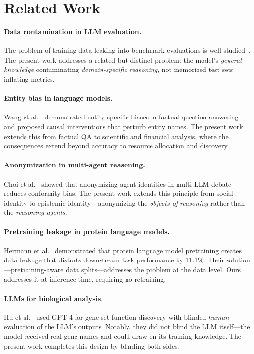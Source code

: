 \documentclass[sigconf, nonacm]{acmart}
\begin{document}
\section{Related Work}

\paragraph{Data contamination in LLM evaluation.} The problem of training data leaking into benchmark evaluations is well-studied~\cite{oren2024,golchin2024,sainz2023}. The present work addresses a related but distinct problem: the model's \textit{general knowledge} contaminating \textit{domain-specific reasoning}, not memorized test sets inflating metrics.

\paragraph{Entity bias in language models.} Wang et al.~\cite{wang2023} demonstrated entity-specific biases in factual question answering and proposed causal interventions that perturb entity names. The present work extends this from factual QA to scientific and financial analysis, where the consequences extend beyond accuracy to resource allocation and discovery.

\paragraph{Anonymization in multi-agent reasoning.} Choi et al.~\cite{choi2025} showed that anonymizing agent identities in multi-LLM debate reduces conformity bias. The present work extends this principle from social identity to epistemic identity---anonymizing the \textit{objects of reasoning} rather than the \textit{reasoning agents}.

\paragraph{Pretraining leakage in protein language models.} Hermann et al.~\cite{hermann2024} demonstrated that protein language model pretraining creates data leakage that distorts downstream task performance by 11.1\%. Their solution---pretraining-aware data splits---addresses the problem at the data level. Ours addresses it at inference time, requiring no retraining.

\paragraph{LLMs for biological analysis.} Hu et al.~\cite{hu2025} used GPT-4 for gene set function discovery with blinded \textit{human} evaluation of the LLM's outputs. Notably, they did not blind the LLM itself---the model received real gene names and could draw on its training knowledge. The present work completes this design by blinding both sides.
\end{document}
